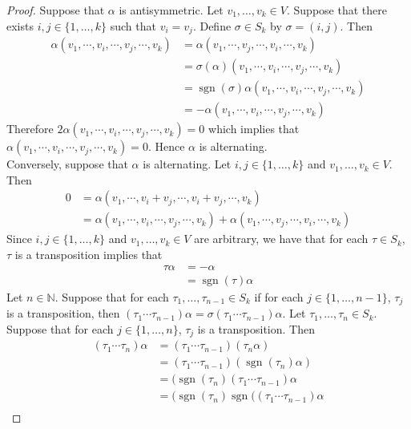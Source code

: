 \documentclass{book}
\theoremstyle{definition}
\newcommand{\al}{\alpha}
\newcommand{\sig}{\sigma}
\newcommand{\N}{\mathbb{N}}
\DeclareMathOperator{\sgn}{sgn}
\DeclareMathOperator*{\0}{\mbf{0}}
\DeclareMathOperator*{\1}{\mbf{1}}
\begin{document}
	\begin{proof}
		Suppose that $\al$ is antisymmetric. Let $v_1, \ldots, v_k \in V$. Suppose that there exists $i,j \in \{1, \ldots, k\}$ such that $v_i = v_j$. Define $\sig \in S_k$ by $\sig = (i,j)$. Then 
		\begin{align*}
			\al (v_1, \cdots, v_i, \cdots, v_j, \cdots,  v_k)  
			& = \al (v_1, \cdots, v_j, \cdots, v_i, \cdots,  v_k)  \\
			& = \sig(\al) (v_1, \cdots, v_i, \cdots, v_j, \cdots,  v_k) \\
			& = \sgn(\sig)\al (v_1, \cdots, v_i, \cdots, v_j, \cdots,  v_k) \\
			& = -\al (v_1, \cdots, v_i, \cdots, v_j, \cdots,  v_k) 
		\end{align*} 
		Therefore $2 \al (v_1, \cdots, v_i, \cdots, v_j, \cdots,  v_k) = 0$ which implies that $\al (v_1, \cdots, v_i, \cdots, v_j, \cdots,  v_k) = 0$. Hence $\al$ is alternating. \\
		Conversely, suppose that $\al$ is alternating. Let $i,j \in \{1, \ldots, k\}$ and $v_1, \ldots, v_k \in V$. Then 
		\begin{align*}
			0 
			& = \al(v_1, \cdots, v_i + v_j, \cdots, v_i + v_j, \cdots,  v_k) \\
			& = \al(v_1, \cdots, v_i, \cdots, v_j, \cdots,  v_k) + \al(v_1, \cdots, v_j, \cdots, v_i, \cdots,  v_k)
		\end{align*}
		Since $i,j \in \{1, \ldots, k\}$ and $v_1, \ldots, v_k \in V$ are arbitrary, we have that for each $\tau \in S_k$, $\tau$ is a transposition implies that
		\begin{align*}
			\tau \al
			& = - \al \\
			& = \sgn(\tau) \al
		\end{align*}
		Let $n \in \N$. Suppose that for each $\tau_1, \ldots, \tau_{n-1} \in S_k$ if for each $j \in \{1, \ldots, n-1\}$, $\tau_j$ is a transposition, then $(\tau_1 \cdots \tau_{n-1}) \al = \sig(\tau_1 \cdots \tau_{n-1}) \al$. Let $\tau_1, \ldots, \tau_n \in S_k$. Suppose that for each $j \in \{1, \ldots, n\}$, $\tau_j$ is a transposition.
		Then 
		\begin{align*}
			(\tau_1 \cdots \tau_n) \al 
			& = (\tau_1 \cdots \tau_{n-1}) (\tau_n \al) \\
			& = (\tau_1 \cdots \tau_{n-1}) (\sgn(\tau_n ) \al) \\
			& = (\sgn(\tau_n ) (\tau_1 \cdots \tau_{n-1}) \al \\
			& = (\sgn(\tau_n ) \sgn((\tau_1 \cdots \tau_{n-1}) \al \\

\end{align*}
\end{proof}
\end{document}

